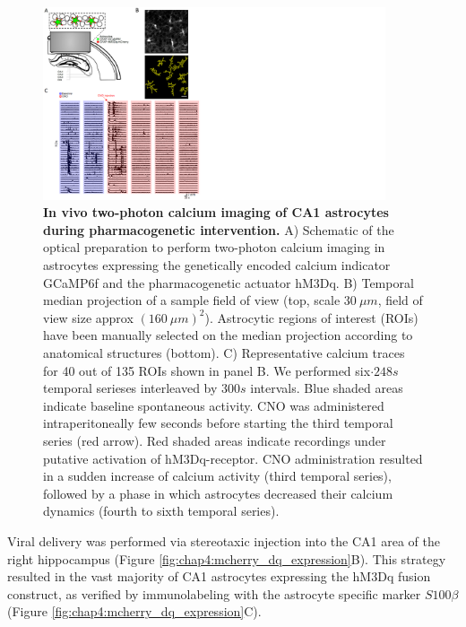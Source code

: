 \begin{figure}[h!]
    \centering
    \includegraphics[trim={0 0 500 0},clip,width=0.9\textwidth]{Figures/Chapter4/CNO_effect_calcium.pdf}
    \caption[In vivo two-photon calcium imaging of CA1 astrocytes during pharmacogenetic intervention.]{\textbf{In vivo two-photon calcium imaging of CA1 astrocytes during pharmacogenetic intervention.} 
    A) Schematic of the optical preparation to perform two-photon calcium imaging in astrocytes expressing the genetically encoded calcium indicator GCaMP6f and the pharmacogenetic actuator hM3Dq. 
    B) Temporal median projection of a sample field of view (top, scale $30\ \mu m$, field of view size approx $(160\ \mu m)^2$). 
    Astrocytic regions of interest (ROIs) have been manually selected on the median projection according to anatomical structures (bottom). 
    C) Representative calcium traces for 40 out of 135 ROIs shown in panel B. We performed six$\cdot 248 s$ temporal serieses interleaved by $300 s$ intervals. 
    Blue shaded areas indicate baseline spontaneous activity. 
    CNO was administered intraperitoneally few seconds before starting the third temporal series (red arrow).  
    Red shaded areas indicate recordings under putative activation of hM3Dq-receptor. 
    CNO administration resulted in a sudden increase of calcium activity (third temporal series), followed by a phase in which astrocytes decreased their calcium dynamics (fourth to sixth temporal series).}
    \label{fig:chap4:CNO_effect_calcium}
\end{figure}
Viral delivery was performed via stereotaxic injection into the CA1 area of the right hippocampus (Figure \ref{fig:chap4:mcherry_dq_expression}B).
This strategy resulted in the vast majority of CA1 astrocytes expressing the hM3Dq fusion construct, as verified by immunolabeling with the astrocyte specific marker $S100\beta$ (Figure \ref{fig:chap4:mcherry_dq_expression}C).
